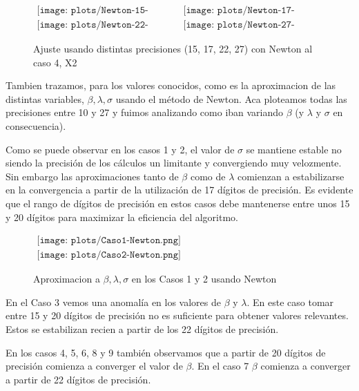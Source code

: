 \begin{figure} [H]
$\begin{array}{cc}
\texttt{[image: plots/Newton-15-caso4.png]} &
\texttt{[image: plots/Newton-17-caso4.png]} \\
\texttt{[image: plots/Newton-22-caso4.png]} &
\texttt{[image: plots/Newton-27-caso4.png]}
\end{array}$
\caption{Ajuste usando distintas precisiones (15, 17, 22, 27) con Newton al caso 4, X2}
\label{fig:FitCaso4Newton}
\end{figure}


Tambien trazamos, para los valores conocidos, como es la aproximacion de las distintas variables, $\beta, \lambda, \sigma$ usando el m\'etodo de Newton.
Aca ploteamos todas las precisiones entre 10 y 27 y fuimos analizando como iban variando $\beta$ (y $\lambda$ y $\sigma$ en consecuencia).

Como se puede observar en los casos 1 y 2, el valor de $\sigma$ se mantiene estable no siendo la precisi\'on de los c\'alculos un limitante y convergiendo muy velozmente. Sin embargo las aproximaciones tanto de $\beta$ como de $\lambda$ comienzan a estabilizarse en la convergencia a partir de la utilizaci\'on de 17 d\'igitos de precisi\'on. Es evidente que el rango de d\'igitos de precisi\'on en estos casos debe mantenerse entre unos 15 y 20 d\'igitos para maximizar la eficiencia del algoritmo.  

\begin{figure}
$\begin{array}{c}
\texttt{[image: plots/Caso1-Newton.png]} \\
\texttt{[image: plots/Caso2-Newton.png]}
\end{array}$

\caption{Aproximacion a $\beta, \lambda, \sigma$ en los Casos 1 y 2 usando Newton}
\end{figure}

En el Caso 3 vemos una anomal\'ia en los valores de $\beta$ y $\lambda$. En este caso tomar entre 15 y 20 d\'igitos de precisi\'on no es suficiente para obtener valores relevantes. Estos se estabilizan recien a partir de los 22 d\'igitos de precisi\'on.


En los casos 4, 5, 6, 8 y 9 tambi\'en observamos que a partir de 20 d\'igitos de precisi\'on comienza a converger el valor de $\beta$. En el caso 7 $\beta$ comienza a converger a partir de 22 d\'igitos de precisi\'on.

